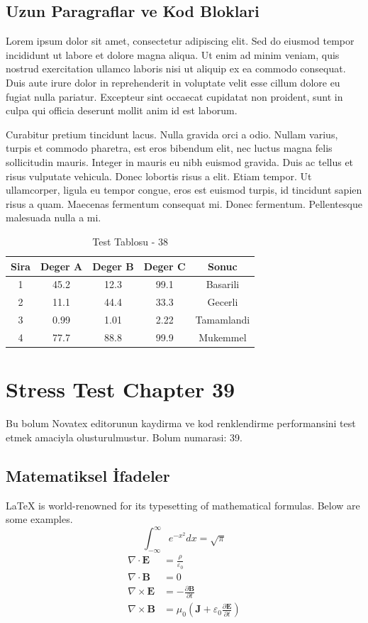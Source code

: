 \documentclass[12pt,a4paper]{article}
\begin{document}
\subsection{Uzun Paragraflar ve Kod Bloklari}
Lorem ipsum dolor sit amet, consectetur adipiscing elit. Sed do eiusmod tempor incididunt ut labore et dolore magna aliqua. Ut enim ad minim veniam, quis nostrud exercitation ullamco laboris nisi ut aliquip ex ea commodo consequat. Duis aute irure dolor in reprehenderit in voluptate velit esse cillum dolore eu fugiat nulla pariatur. Excepteur sint occaecat cupidatat non proident, sunt in culpa qui officia deserunt mollit anim id est laborum.

Curabitur pretium tincidunt lacus. Nulla gravida orci a odio. Nullam varius, turpis et commodo pharetra, est eros bibendum elit, nec luctus magna felis sollicitudin mauris. Integer in mauris eu nibh euismod gravida. Duis ac tellus et risus vulputate vehicula. Donec lobortis risus a elit. Etiam tempor. Ut ullamcorper, ligula eu tempor congue, eros est euismod turpis, id tincidunt sapien risus a quam. Maecenas fermentum consequat mi. Donec fermentum. Pellentesque malesuada nulla a mi.

\begin{table}[h!]
\centering
\begin{tabular}{|c|c|c|c|c|}
\hline
\textbf{Sira} & \textbf{Deger A} & \textbf{Deger B} & \textbf{Deger C} & \textbf{Sonuc} \\
\hline
1 & 45.2 & 12.3 & 99.1 & Basarili \\
2 & 11.1 & 44.4 & 33.3 & Gecerli \\
3 & 0.99 & 1.01 & 2.22 & Tamamlandi \\
4 & 77.7 & 88.8 & 99.9 & Mukemmel \\
\hline
\end{tabular}
\caption{Test Tablosu - 38}
\end{table}

\newpage
\section{Stress Test Chapter 39}
Bu bolum Novatex editorunun kaydirma ve kod renklendirme performansini test etmek amaciyla olusturulmustur. Bolum numarasi: 39.

\subsection{Matematiksel İfadeler}
\LaTeX{} is world-renowned for its typesetting of mathematical formulas. Below are some examples.
\begin{equation}
\int_{-\infty}^{\infty} e^{-x^2} dx = \sqrt{\pi}
\end{equation}
\begin{align}
\nabla \cdot \mathbf{E} &= \frac{\rho}{\varepsilon_0} \\
\nabla \cdot \mathbf{B} &= 0 \\
\nabla \times \mathbf{E} &= -\frac{\partial \mathbf{B}}{\partial t} \\
\nabla \times \mathbf{B} &= \mu_0\left(\mathbf{J} + \varepsilon_0 \frac{\partial \mathbf{E}}{\partial t}\right)
\end{align}
\end{document}
